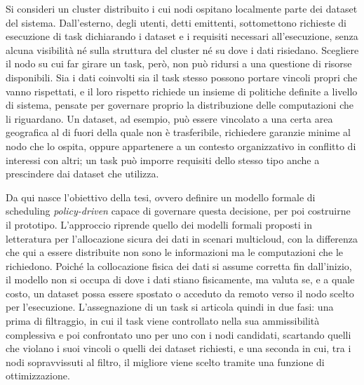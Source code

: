 Si consideri un cluster distribuito i cui nodi ospitano localmente parte dei dataset del sistema. Dall'esterno, degli utenti, detti emittenti, sottomettono richieste di esecuzione di task dichiarando i dataset e i requisiti necessari all'esecuzione, senza alcuna visibilità né sulla struttura del cluster né su dove i dati risiedano. Scegliere il nodo su cui far girare un task, però, non può ridursi a una questione di risorse disponibili. Sia i dati coinvolti sia il task stesso possono portare vincoli propri che vanno rispettati, e il loro rispetto richiede un insieme di politiche definite a livello di sistema, pensate per governare proprio la distribuzione delle computazioni che li riguardano. Un dataset, ad esempio, può essere vincolato a una certa area geografica al di fuori della quale non è trasferibile, richiedere garanzie minime al nodo che lo ospita, oppure appartenere a un contesto organizzativo in conflitto di interessi con altri; un task può imporre requisiti dello stesso tipo anche a prescindere dai dataset che utilizza.

Da qui nasce l'obiettivo della tesi, ovvero definire un modello formale di scheduling \emph{policy-driven} capace di governare questa decisione, per poi costruirne il prototipo. L'approccio riprende quello dei modelli formali proposti in letteratura per l'allocazione sicura dei dati in scenari multicloud, con la differenza che qui a essere distribuite non sono le informazioni ma le computazioni che le richiedono. Poiché la collocazione fisica dei dati si assume corretta fin dall'inizio, il modello non si occupa di dove i dati stiano fisicamente, ma valuta se, e a quale costo, un dataset possa essere spostato o acceduto da remoto verso il nodo scelto per l'esecuzione. L'assegnazione di un task si articola quindi in due fasi: una prima di filtraggio, in cui il task viene controllato nella sua ammissibilità complessiva e poi confrontato uno per uno con i nodi candidati, scartando quelli che violano i suoi vincoli o quelli dei dataset richiesti, e una seconda in cui, tra i nodi sopravvissuti al filtro, il migliore viene scelto tramite una funzione di ottimizzazione.

